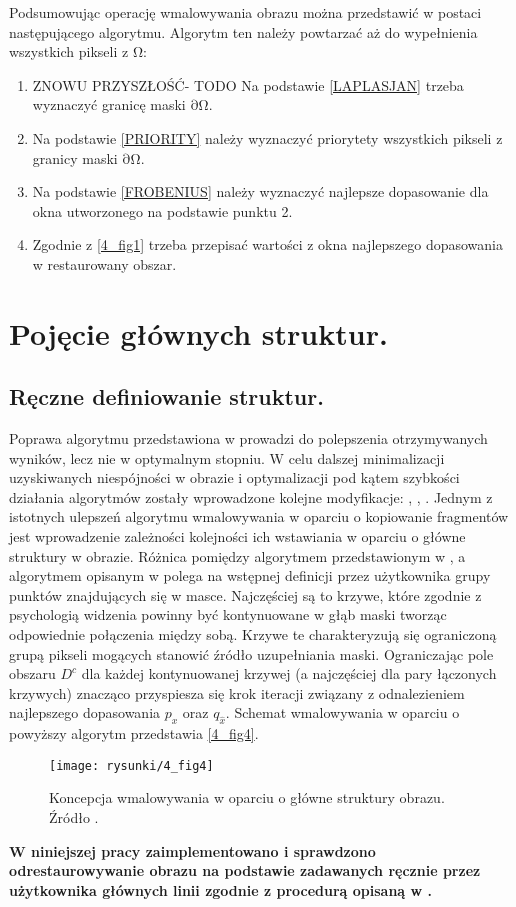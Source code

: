 \documentclass[12pt, twoside, openany]{report}
\theoremstyle{definition}
\begin{document}
Podsumowując operację wmalowywania obrazu można przedstawić w postaci następującego algorytmu. Algorytm ten należy powtarzać aż do wypełnienia wszystkich pikseli z $\mathrm{\Omega }$:
\begin{enumerate}
\item
ZNOWU PRZYSZŁOŚĆ- TODO
Na podstawie \eqref{LAPLASJAN} trzeba wyznaczyć granicę maski $\mathrm{\partial }\mathrm{\Omega }$.
\item
Na podstawie \eqref{PRIORITY} należy wyznaczyć priorytety wszystkich pikseli z granicy maski $\mathrm{\partial }\mathrm{\Omega }$.
\item
Na podstawie \eqref{FROBENIUS} należy wyznaczyć najlepsze dopasowanie dla okna utworzonego na podstawie punktu 2.
\item
Zgodnie z \autoref{4_fig1} trzeba przepisać wartości z okna najlepszego dopasowania w restaurowany obszar.
\end{enumerate}
\section{Pojęcie głównych struktur.}
\label{sec:crimMetodSalient}
\subsection{Ręczne definiowanie struktur.}
Poprawa algorytmu przedstawiona w \cite{criminisi2004region} prowadzi do polepszenia otrzymywanych wyników, lecz nie w optymalnym stopniu. W celu dalszej minimalizacji uzyskiwanych niespójności w obrazie i optymalizacji pod kątem szybkości działania algorytmów zostały wprowadzone kolejne modyfikacje: \cite{StructurePropagationManual},  \cite{malluvalasaimplementation}, \cite{SalientStrucTexProp}. 
Jednym z istotnych ulepszeń algorytmu wmalowywania w oparciu o kopiowanie fragmentów jest wprowadzenie zależności kolejności ich wstawiania w oparciu o główne struktury w obrazie.
Różnica pomiędzy algorytmem przedstawionym w \cite{criminisi2004region}, a algorytmem opisanym w \cite{StructurePropagationManual} polega na wstępnej definicji przez użytkownika grupy punktów znajdujących się w masce. Najczęściej są to krzywe, które zgodnie z psychologią widzenia powinny być kontynuowane w głąb maski tworząc odpowiednie połączenia między sobą. Krzywe te charakteryzują się ograniczoną grupą pikseli mogących stanowić źródło uzupełniania maski. Ograniczając pole obszaru $D^c$ dla każdej kontynuowanej krzywej (a najczęściej dla pary łączonych krzywych) znacząco przyspiesza się krok iteracji związany z odnalezieniem najlepszego dopasowania $p_x$ oraz $q_{\hat{x}}$. Schemat wmalowywania w oparciu o powyższy algorytm przedstawia \autoref{4_fig4}.
\begin{figure}[!h]
	\centering
	\texttt{[image: rysunki/4\_fig4]}
	\caption{Koncepcja wmalowywania w oparciu o główne struktury obrazu. Źródło \cite{StructurePropagationManual}.}
	\label{4_fig4} 
\end{figure}
\textbf{W niniejszej pracy zaimplementowano i sprawdzono odrestaurowywanie obrazu na podstawie zadawanych ręcznie przez użytkownika głównych linii zgodnie z procedurą opisaną w  \cite{StructurePropagationManual}.}
\end{document}
